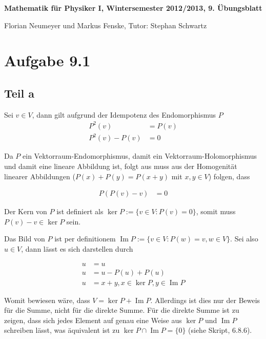 \documentclass[a4paper,german,12pt,smallheadings]{scrartcl}
\begin{document}
\begin{center}
\bfseries %
\sffamily %
\vspace{-40pt}
Mathematik für Physiker I, Wintersemester 2012/2013, 9. Übungsblatt

Florian Neumeyer und Markus Fenske, Tutor: Stephan Schwartz
\vspace{-10pt}
\end{center}


\section*{Aufgabe 9.1}
\subsection*{Teil a}

Sei $v \in V$, dann gilt aufgrund der Idempotenz des Endomorphismus $P$
\begin{align*}
  P^2(v) &= P(v) \\
  P^2(v) - P(v) &= 0
\end{align*}

Da $P$ ein Vektorraum-Endomorphismus, damit ein Vektorraum-Holomorphismus und
damit eine lineare Abbildung ist, folgt aus muss aus der Homogenität linearer
Abbildungen ($P(x) + P(y) = P(x+y)$ mit $x{,}y \in V$) folgen, dass

\begin{align*}
  P(P(v) - v) &= 0
\end{align*}

Der Kern von $P$ ist definiert als $\ker P := \{v \in V: P(v) = 0\}$, somit
muss $P(v) - v \in \ker P$ sein.

Das Bild von $P$ ist per definitionem $\operatorname{Im} P := \{v \in V: P(w) = v, w \in V\}$.
Sei also $u \in V$, dann lässt es sich darstellen durch

\begin{align*}
  u &= u \\
  u &= u - P(u) + P(u) \\
  u &= x + y, x \in \ker P, y \in \operatorname{Im} P
\end{align*}

Womit bewiesen wäre, dass $V = \ker P + \operatorname{Im} P$. Allerdings ist
dies nur der Beweis für die Summe, nicht für die direkte Summe. Für die direkte
Summe ist zu zeigen, dass sich jedes Element auf genau eine Weise aus $\ker P$
und $\operatorname{Im} P$ schreiben lässt, was äquivalent ist zu $\ker P \cap
\operatorname{Im} P = \{0\}$ (siehe Skript, 6.8.6).
\end{document}
